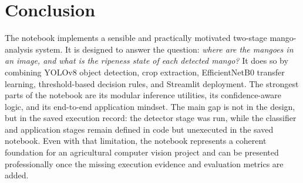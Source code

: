 \documentclass[12pt,a4paper]{article}
\begin{document}
\section{Conclusion}
The notebook implements a sensible and practically motivated two-stage mango-analysis system. It is designed to answer the question: \emph{where are the mangoes in an image, and what is the ripeness state of each detected mango?} It does so by combining YOLOv8 object detection, crop extraction, EfficientNetB0 transfer learning, threshold-based decision rules, and Streamlit deployment. The strongest parts of the notebook are its modular inference utilities, its confidence-aware logic, and its end-to-end application mindset. The main gap is not in the design, but in the saved execution record: the detector stage was run, while the classifier and application stages remain defined in code but unexecuted in the saved notebook. Even with that limitation, the notebook represents a coherent foundation for an agricultural computer vision project and can be presented professionally once the missing execution evidence and evaluation metrics are added.
\end{document}
